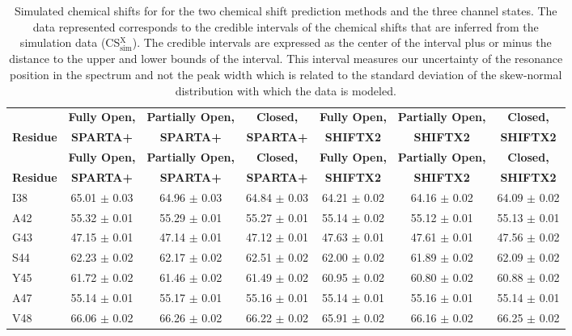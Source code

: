 \documentclass[%
 aip,
 amsmath,amssymb,
 preprint,%
]{revtex4-1}
\newcommand{\ca}{\ce{C_\alpha} }
\begin{document}
\begingroup
\begin{center}
\begin{longtable}{l|c|c|c|c|c|c}
\caption{\scriptsize Simulated chemical shifts for \ca for the two chemical shift prediction methods and the three channel states. The data represented corresponds to the credible intervals of the chemical shifts that are inferred from the simulation data (CS$_\text{sim}^\text{X}$). The credible intervals are expressed as the center of the interval plus or minus the distance to the upper and lower bounds of the interval. This interval measures our uncertainty of the resonance position in the spectrum and not the peak width which is related to the standard deviation of the skew-normal distribution with which the data is modeled. \label{SI_tb_CSsim_CA}}\\ 
\hline 
\hline 
& \textbf{Fully Open,} & \textbf{Partially Open,} & \textbf{Closed,} & \textbf{Fully Open,} & \textbf{Partially Open,} & \textbf{Closed,}  \\
\textbf{Residue} & \textbf{SPARTA+} & \textbf{SPARTA+} & \textbf{SPARTA+} & \textbf{SHIFTX2} & \textbf{SHIFTX2} & \textbf{SHIFTX2}  \\
\hline
\endfirsthead 
\hline
& \textbf{Fully Open,} & \textbf{Partially Open,} & \textbf{Closed,} & \textbf{Fully Open,} & \textbf{Partially Open,} & \textbf{Closed,}  \\
\textbf{Residue} & \textbf{SPARTA+} & \textbf{SPARTA+} & \textbf{SPARTA+} & \textbf{SHIFTX2} & \textbf{SHIFTX2} & \textbf{SHIFTX2}  \\ \hline
\endhead
I38 & 65.01 $\pm$ 0.03 & 64.96 $\pm$ 0.03 & 64.84 $\pm$ 0.03 & 64.21 $\pm$ 0.02 & 64.16 $\pm$ 0.02 & 64.09 $\pm$ 0.02 \\
A42 & 55.32 $\pm$ 0.01 & 55.29 $\pm$ 0.01 & 55.27 $\pm$ 0.01 & 55.14 $\pm$ 0.02 & 55.12 $\pm$ 0.01 & 55.13 $\pm$ 0.01 \\
G43 & 47.15 $\pm$ 0.01 & 47.14 $\pm$ 0.01 & 47.12 $\pm$ 0.01 & 47.63 $\pm$ 0.01 & 47.61 $\pm$ 0.01 & 47.56 $\pm$ 0.02 \\
S44 & 62.23 $\pm$ 0.02 & 62.17 $\pm$ 0.02 & 62.51 $\pm$ 0.02 & 62.00 $\pm$ 0.02 & 61.89 $\pm$ 0.02 & 62.09 $\pm$ 0.02 \\
Y45 & 61.72 $\pm$ 0.02 & 61.46 $\pm$ 0.02 & 61.49 $\pm$ 0.02 & 60.95 $\pm$ 0.02 & 60.80 $\pm$ 0.02 & 60.88 $\pm$ 0.02 \\
A47 & 55.14 $\pm$ 0.01 & 55.17 $\pm$ 0.01 & 55.16 $\pm$ 0.01 & 55.14 $\pm$ 0.01 & 55.16 $\pm$ 0.01 & 55.14 $\pm$ 0.01 \\
V48 & 66.06 $\pm$ 0.02 & 66.26 $\pm$ 0.02 & 66.22 $\pm$ 0.02 & 65.91 $\pm$ 0.02 & 66.16 $\pm$ 0.02 & 66.25 $\pm$ 0.02 \\

\end{longtable}
\end{center}
\end{document}
